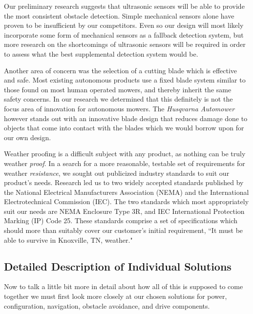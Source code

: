 \documentclass[12pt,letterpaper]{article}
\begin{document}
Our preliminary research suggests that ultrasonic sensors will be able to
provide the most consistent obstacle detection.  Simple mechanical sensors alone
have proven to be insufficient by our competitors. Even so our design will most
likely incorporate some form of mechanical sensors as a fallback detection
system, but more research on the shortcomings of ultrasonic sensors will be
required in order to assess what the best supplemental detection system would
be.

Another area of concern was the selection of a cutting blade which is effective
and safe.  Most existing autonomous products use a fixed blade system similar to
those found on most human operated mowers, and thereby inherit the same safety
concerns.  In our research we determined that this definitely is not the focus
area of innovation for autonomous mowers. The \textit{Husqvarna
Automower}\autocite{automower} however stands out with an innovative blade
design that reduces damage done to objects that come into contact with the blades which we would borrow upon for our own design.

Weather proofing is a difficult subject with any product, as nothing can be
truly weather \textit{proof}.  In a search for a more reasonable, testable set
of requirements for weather \textit{resistance}, we sought out publicized
industry standards to suit our product's needs.  Research led us to two widely
accepted standards published by the National Electrical Manufacturers
Association (NEMA) and the International Electrotechnical Commission (IEC).  The
two standards which most appropriately suit our needs are NEMA Enclosure Type
3R\autocite{nema3r}, and IEC International Protection Marking (IP) Code
25.\autocite{ip25}  These standards comprise a set of specifications which
should more than suitably cover our customer's initial requirement, ``It must be
able to survive in Knoxville, TN, weather."

\subsection{Detailed Description of Individual Solutions}
Now to talk a little bit more in detail about how all of this is supposed to
come together we must first look more closely at our chosen solutions for power,
configuration, navigation, obstacle avoidance, and drive components. 
\end{document}
